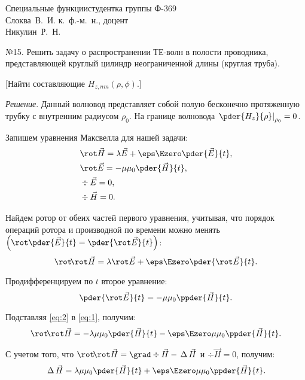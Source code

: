 





\renewcommand{\L}{\,\Delta\,}


{Специальные функции}{студентка группы Ф-369\\Слоква~В.~И.}
{к.~ф.-м.~н., доцент\\Никулин~Р.~Н.}{\!\!}

№15. Решить задачу о распространении ТЕ-волн в полости проводника,
представляющей круглый цилиндр неограниченной длины (круглая труба).
    
[Найти составляющие \( H_{z, nm}(\rho, \phi)\).]

\vspace*{2em}
\emph{Решение}. Данный волновод представляет собой полую бесконечно
протяженную трубку с внутренним радиусом \( \rho_0 \).
На границе волновода \( \left.\pder{H_z}{\rho}\right|_{\rho_0} = 0 \).

Запишем уравнения Максвелла для нашей задачи:
\begin{align*}
    & \rot\vec{H} = \lambda\vec{E} + \eps\Ezero\pder{\vec{E}}{t}, \\
    & \rot\vec{E} = -\mu\mu_0\pder{\vec{H}}{t}, \\
    & \div\vec{E} = 0, \\
    & \div\vec{H} = 0.
\end{align*}

Найдем ротор от обеих частей первого уравнения, учитывая, что порядок операций
ротора и производной по времени можно менять
\( \left(\rot\pder{\vec{E}}{t}= \pder{\rot\vec{E}}{t}\right) \):
\begin{equation}
    \rot\!\rot\vec{H} = \lambda\rot\vec{E} + \eps\Ezero\pder{\rot\vec{E}}{t}.
    \label{eq:1}
\end{equation}

Продифференцируем по \( t \) второе уравнение:
\begin{equation}
    \pder{\rot\vec{E}}{t} = -\mu\mu_0\ppder{\vec{H}}{t}.
    \label{eq:2}
\end{equation}

Подставляя \eqref{eq:2} в \eqref{eq:1}, получим:
\[
    \rot\!\rot\vec{H} = -\lambda\mu\mu_0\pder{\vec{H}}{t} - \eps\Ezero\mu\mu_0
    \ppder{\vec{H}}{t}.
\]

С учетом того, что \( \rot\!\rot\vec{H} = \grad\div\vec{H} - \L\vec{H} \) и
\( \div\vec{H} = 0 \), получим:
\begin{equation}
    \L\vec{H} = \lambda\mu\mu_0\pder{\vec{H}}{t} + \eps\Ezero\mu\mu_0
    \ppder{\vec{H}}{t}.
    \label{eq:4}
\end{equation}


